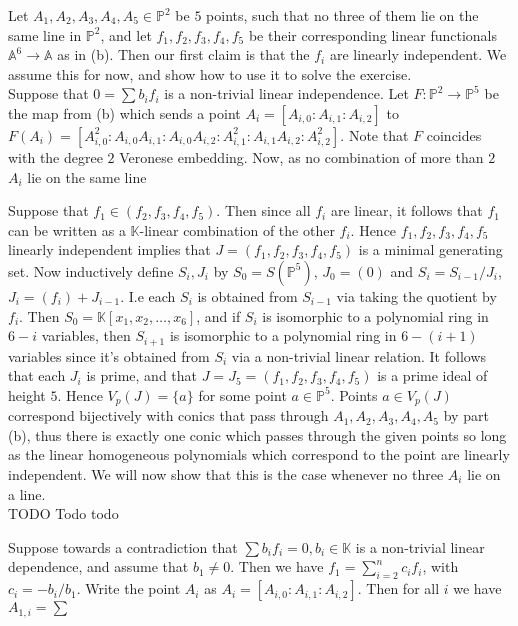 \documentclass{article}
\theoremstyle{definition}
\newcommand{\K}{\mathbb{K}}
\renewcommand{\P}{\mathbb{P}}
\newcommand{\A}{\mathbb{A}}
\newcommand{\KP}[2]{\K[#1_1, #1_2, \ldots, #1_{#2}]}
\renewcommand{\AA}[1]{\A^{#1}}
\newcommand{\PP}[1]{\P^{#1}}
\begin{document}
Let $A_1,A_2,A_3,A_4,A_5 \in \PP{2}$ be $5$ points, such that no three of them
lie on the same line in $\PP{2}$, and let $f_1,f_2,f_3,f_4,f_5$ be their
corresponding linear functionals $\AA{6} \to \A$ as in (b). Then our first
claim is that the $f_i$ are linearly independent. We assume this for now, and
show how to use it to solve the exercise. \\

Suppose that $0 = \sum b_i f_i$ is a non-trivial linear independence. 
Let $F : \PP{2} \to \PP{5}$ be the map from (b) which sends a point $A_i=[A_{i,
0}:A_{i, 1}:A_{i, 2}]$ to $F(A_i) = [A_{i, 0}^{2} : A_{i, 0}A_{i, 1} : A_{i,
0}A_{i, 2} : A_{i, 1}^{2} : A_{i, 1}A_{i, 2} : A_{i, 2}^{2}]$. Note that $F$
coincides with the degree $2$ Veronese embedding. Now, as no combination
of more than $2$ $A_i$ lie on the same line

Suppose that $f_1 \in (f_2,f_3,f_4,f_5)$. Then since all $f_i$ are linear, it
follows that $f_1$ can be written as a $\K$-linear combination of the other
$f_i$. Hence $f_1,f_2,f_3,f_4,f_5$ linearly independent implies that $J =
(f_1,f_2,f_3,f_4,f_5)$ is a minimal generating set. Now inductively define
$S_i, J_i$ by $S_0 = S(\PP{5})$, $J_0 = (0)$ and $S_i = S_{i - 1}/J_i$, $J_i =
(f_i) + J_{i - 1}$. I.e each $S_i$ is obtained from $S_{i - 1}$ via taking the
quotient by $f_i$. Then $S_0 = \KP{x}{6}$, and if $S_i$ is isomorphic to a
polynomial ring in $6- i$ variables, then $S_{i + 1}$ is isomorphic to a
polynomial ring in $6 - (i + 1)$ variables since it's obtained from $S_i$ via a
non-trivial linear relation. It follows that each $J_i$ is prime, and that $J =
J_5 = (f_1,f_2,f_3,f_4,f_5)$ is a prime ideal of height $5$. Hence $V_p(J) =
\{a\}$ for some point $a \in \PP{5}$. Points $a \in V_p(J)$ correspond
bijectively with conics that pass through $A_1,A_2,A_3,A_4,A_5$ by part (b),
thus there is exactly one conic which passes through the given points so long
as the linear homogeneous polynomials which correspond to the point are
linearly independent. We will now show that this is the case whenever no three
$A_i$ lie on a line.
\\

TODO Todo todo

Suppose towards a contradiction that $\sum b_i f_i = 0, b_i \in \K$ is a
non-trivial linear dependence, and assume that $b_1 \not = 0$. Then we have
$f_1 = \sum_{i = 2}^{n}c_i f_i$, with $c_i = -b_i/b_1$. Write the point $A_i$
as $A_i = [A_{i, 0}:A_{i, 1}:A_{i, 2}]$. 
Then for all $i$ we have $A_{1, i} = \sum $
\end{document}
